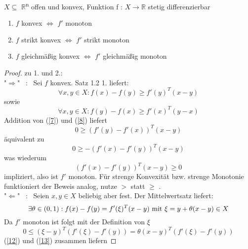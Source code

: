 	\begin{satz}
		$X\subseteq$ $\mathbb{R}$\textsuperscript{n} offen und konvex, Funktion f : $X\to\mathbb{R}$ stetig differenzierbar
		\begin{enumerate}
			\item $f$ konvex \( \Leftrightarrow \) $f'$ monoton
			\item $f$ strikt konvex \( \Leftrightarrow \) $f'$ strikt monoton
			\item $f$ gleichmäßig konvex \( \Leftrightarrow \) $f'$ gleichmäßig monoton
		\end{enumerate}
	\end{satz}
	\begin{proof}
		zu 1. und 2.: \\
		"\( \Rightarrow \)" \ : \ Sei $f$ konvex. Satz 1.2 1. liefert: \begin{equation} \label{7}
		\forall x,y \in X: f(x)-f(y) \geq f'(y)^T(x-y) \end{equation} sowie
		\begin{equation} \label{8}
		\forall x,y \in X: f(y)-f(x) \geq f'(x)^T(y-x)
		\end{equation}
		Addition von (\ref{7}) und (\ref{8}) liefert
		\begin{equation*} \label{9}
		0 \geq (f'(y)-f'(x))^T(x-y)
		\end{equation*}
		äquivalent zu
		\begin{equation*} \label{10}
		0 \geq -(f'(x)-f'(y))^T(x-y)
		\end{equation*}
		was wiederum 
		\begin{equation*} \label{11}
		(f'(x)-f'(y))^T(x-y) \geq 0
		\end{equation*} impliziert, also ist $f'$ monoton.
		Für strenge Konvexität bzw. strenge Monotonie funktioniert der Beweis analog, nutze \(>\) statt  \( \geq \) . \\
		"\( \Leftarrow \)" \ : \ Seien $x,y \in X$ beliebig aber fest. Der Mittelwertsatz liefert:
		\begin{equation} \label{12}
		\exists \theta \in (0,1): f(x)-f(y)=f'(\xi)^T(x-y) \ \textnormal{mit} \ \xi =y+ \theta (x-y) \in X
		\end{equation}
		Da $f'$ monoton ist folgt mit der Definition von \( \xi\)
		\begin{equation} \label{13}
		0 \leq (\xi -y)^T(f'( \xi )-f'(y))=\theta (x-y)^T(f'(\xi)-f'(y))
		\end{equation}
		(\ref{12}) und (\ref{13}) zusammen liefern

\end{proof}
